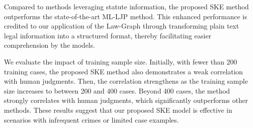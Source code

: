 Compared to methods leveraging statute information, the proposed SKE method outperforms the state-of-the-art ML-LJP method. This enhanced performance is credited to our application of the Law-Graph through transforming plain text legal information into a structured format, thereby facilitating easier comprehension by the models.

We evaluate the impact of training sample size. Initially, with fewer than 200 training cases, the proposed SKE method also demonstrates a weak correlation with human judgments. Then, the correlation strengthens as the training sample size increases to between 200 and 400 cases. Beyond 400 cases, the method strongly correlates with human judgments, which significantly outperforms other methods. These results suggest that our proposed SKE model is effective in scenarios with infrequent crimes or limited case examples.


